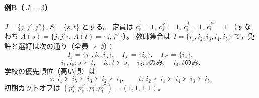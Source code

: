 \documentclass[12pt, a4paper]{article}
\theoremstyle{definition}
\theoremstyle{remark}
\theoremstyle{plain}
\begin{document}




\paragraph{例B（\(|J|=3\)）}
\(
J=\{j,j',j''\},\ S=\{s,t\}
\) とする。
定員は
\(
c^j_s=1,\ c^{j'}_s=1,\ c^j_t=1,\ c^{j''}_t=1
\)
（すなわち
\(A(s)=\{j,j'\},\ A(t)=\{j,j''\}\)）。
教師集合は
\(
I=\{i_1,i_2,i_3,i_4,i_5\}
\)
で，免許と選好は次の通り（全員 \( \succ \emptyset\)）：
\[
I_j=\{i_1,i_2,i_5\},\quad I_{j'}=\{i_3\},\quad I_{j''}=\{i_4\},
\]
\[
i_1,i_5: s \succ t,\quad i_2: t \succ s,\quad i_3: s \text{のみ},\quad i_4: t \text{のみ}.
\]
学校の優先順位（高い順）は
\[
s:\ i_1 \succ i_5 \succ i_3 \succ i_2 \succ i_4,\qquad
t:\ i_2 \succ i_1 \succ i_4 \succ i_3 \succ i_5.
\]
初期カットオフは
\(
(p^j_s,p^{j'}_s,p^j_t,p^{j''}_t)=(1,1,1,1)
\)。



\end{document}
